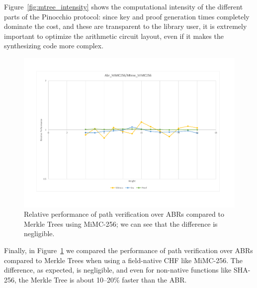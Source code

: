 Figure~\ref{fig:mtree_intensity} shows the computational intensity of the different parts of the
Pinocchio protocol: since key and proof generation times completely dominate the cost, and these
are transparent to the library user, it is extremely important to optimize the arithmetic circuit
layout, even if it makes the synthesizing code more complex.
\begin{figure}
	\centering
	\includegraphics[scale=0.33]{res/mtree_vs_abr.pdf}
	\caption{Relative performance of path verification over ABRs compared to Merkle Trees using
		MiMC-256; we can see that the difference is negligible.}\label{fig:mtree_vs_abr}
\end{figure}

Finally, in Figure~\ref{fig:mtree_vs_abr} we compared the performance of path verification over
ABRs compared to Merkle Trees when using a field-native CHF like MiMC-256.
The difference, as expected, is negligible, and even for non-native functions like SHA-256, the
Merkle Tree is about 10--20\% faster than the ABR\@.

